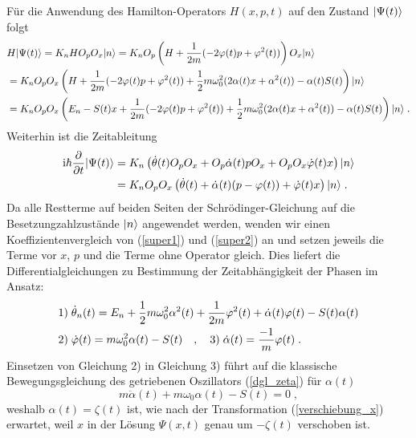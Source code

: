   Für die Anwendung des Hamilton-Operators $H(x,p,t)$ auf den Zustand $\lvert\Psi(t)\rangle$ folgt
  \begin{align}
    &H\lvert\Psi(t)\rangle=K_nHO_pO_x\lvert n\rangle
    =K_nO_p\left(H+\frac{1}{2m}(-2\varphi(t)p+\varphi^2(t))\right)O_x\lvert n\rangle \notag\\
    &=K_nO_pO_x\left(H+\frac{1}{2m}(-2\varphi(t)p+\varphi^2(t))+\frac{1}{2}m\omega_0^2(2\alpha(t)x+\alpha^2(t))-\alpha(t)S(t)\right)\lvert n\rangle \notag\\
    &=K_nO_pO_x
    \left(E_n-S(t)x+\frac{1}{2m}(-2\varphi(t)p+\varphi^2(t))+\frac{1}{2}m\omega_0^2(2\alpha(t)x+\alpha^2(t))-\alpha(t)S(t)\right)\lvert n\rangle \;.
    \label{super1}
  \end{align}
  Weiterhin ist die Zeitableitung
  \begin{align}
    \text i\hbar\frac{\partial}{\partial t} \lvert\Psi(t)\rangle
    &=K_n\left(\dot\theta(t)O_pO_x+O_p\dot\alpha(t)pO_x+O_pO_x\dot\varphi(t)x\right)\lvert n\rangle \notag\\
    &=K_nO_pO_x\left(\dot\theta(t)+\dot\alpha(t)(p-\varphi(t))+\dot\varphi(t)x\right)\lvert n\rangle \; .
    \label{super2}
  \end{align}
  Da alle Restterme auf beiden Seiten der Schrödinger-Gleichung auf die Besetzungzahlzustände $\lvert n\rangle$ angewendet werden, wenden wir einen Koeffizientenvergleich von (\ref{super1}) und (\ref{super2}) an und setzen jeweils die Terme vor $x$, $p$ und die Terme ohne Operator gleich.
  Dies liefert die Differentialgleichungen zu Bestimmung der Zeitabhängigkeit der Phasen im Ansatz:
  \begin{align}
    &1)\; \dot\theta_n(t)=E_n+\frac 1 2 m\omega_0^2\alpha^2(t)+\frac{1}{2m}\varphi^2(t)+\dot\alpha(t)\varphi(t)-S(t)\alpha(t) \notag\\
    &2)\; \dot\varphi(t)=m\omega_0^2\alpha(t)-S(t) \quad,\quad 3) \;\dot\alpha(t)=\frac{-1}{m}\varphi(t) \;.
  \end{align}
  Einsetzen von Gleichung 2) in Gleichung 3) führt auf die klassische Bewegungsgleichung des getriebenen Oszillators (\ref{dgl_zeta}) für $\alpha(t)$
  \begin{equation}
    m\ddot\alpha(t)+m\omega_0\alpha(t)-S(t)=0 \;,
  \end{equation}
  weshalb $\alpha(t)=\zeta(t)$ ist, wie nach der Transformation (\ref{verschiebung_x}) erwartet, weil $x$ in der Lösung $\Psi(x,t)$ genau um $-\zeta(t)$ verschoben ist.
